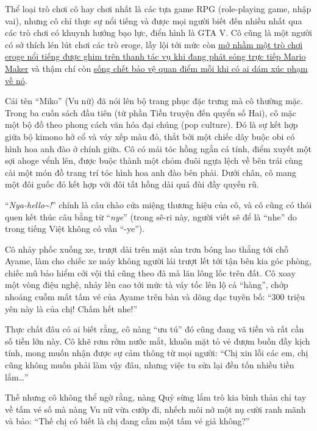 \documentclass[../main.tex]{subfiles}
\begin{document}
Thể loại trò chơi cô hay chơi nhất là các tựa game RPG (role-playing game, nhập vai), nhưng cô chỉ thực sự nổi tiếng và được mọi người biết đến nhiều nhất qua các trò chơi có khuynh hướng bạo lực, điển hình là GTA V. Cô cũng là một người có sở thích lén lút chơi các trò eroge, lầy lội tới mức còn \href{https://www.youtube.com/watch?v=cbmQHSP2wVA}{mở nhầm một trò chơi eroge nổi tiếng được ghim trên thanh tác vụ khi đang phát sóng trực tiếp Mario Maker} và thậm chí còn \href{https://www.youtube.com/watch?v=SB0tbWERuNI}{sống chết bảo vệ quan điểm mỗi khi có ai dám xúc phạm về nó}.

Cái tên ``Miko'' (Vu nữ) đã nói lên bộ trang phục đặc trưng mà cô thường mặc. Trong ba cuốn sách đầu tiên (từ phần Tiền truyện đến quyển số Hai), cô mặc một bộ đồ theo phong cách văn hóa đại chúng (pop culture). Đó là sự kết hợp giữa bộ kimono hở cổ và váy xếp màu đỏ, thắt bởi một chiếc dây buộc obi có hình hoa anh đào ở chính giữa. Cô có mái tóc hồng ngắn cá tính, điểm xuyết một sợi ahoge vểnh lên, được buộc thành một chỏm đuôi ngựa lệch về bên trái cùng cài một món đồ trang trí tóc hình hoa anh đào bên phải. Dưới chân, cô mang một đôi guốc đỏ kết hợp với đôi tất hồng dài quá đùi đầy quyến rũ.

``\textit{Nya-hello\~{}!}'' chính là câu chào cửa miệng thương hiệu của cô, và cô cũng có thói quen kết thúc câu bằng từ ``\textit{nye}'' (trong sê-ri này, người viết sẽ để là ``nhe'' do trong tiếng Việt không có vần ``-ye'').

\chrint


Cô nhảy phốc xuống xe, trượt dài trên mặt sàn trơn bóng lao thẳng tới chỗ Ayame, làm cho chiếc xe máy không người lái trượt lết tới tận bên kia góc phòng, chiếc mũ bảo hiểm cởi vội thì cũng theo đà mà lăn lông lốc trên đất. Cô xoay một vòng điệu nghệ, nhảy lên cao tới mức tà váy tốc lên lộ cả ``hàng'', chớp nhoáng cuỗm mất tấm vé của Ayame trên bàn và dõng dạc tuyên bố: ``300 triệu yên này là của chị! Chấm hết nhe!''

Thực chất đâu có ai biết rằng, cô nàng ``ưu tú'' đó cũng đang vã tiền và rất cần số tiền lớn này. Cô khẽ rơm rớm nước mắt, khuôn mặt tỏ vẻ đượm buồn đầy kịch tính, mong muốn nhận được sự cảm thông từ mọi người: ``Chị xin lỗi các em, chị cũng không muốn phải làm vậy đâu, nhưng việc tu sửa lại đền tốn nhiều tiền lắm\dots''

Thế nhưng cô không thể ngờ rằng, nàng Quỷ sừng lắm trò kia bình thản chỉ tay về tấm vé số mà nàng Vu nữ vừa cướp đi, nhếch môi nở một nụ cười ranh mãnh và bảo: ``Thế chị có biết là chị đang cầm một tấm vé giả không?''
\end{document}
